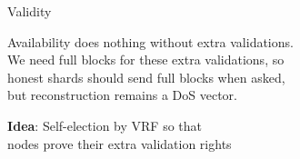 \documentclass[final]{beamer}
\newlength{\sepwid}
\newlength{\onecolwid}
\newlength{\twocolwid}
\begin{document}
\begin{frame}[t]
\begin{columns}[t]
\begin{column}{\twocolwid}
\begin{columns}[t,totalwidth=\twocolwid]
\begin{column}{\onecolwid}
%


\end{column} %

\begin{column}{\onecolwid} %


%


\end{column} %

\end{columns} %

\end{column} %

\begin{column}{\sepwid}\end{column} %

\begin{column}{\onecolwid} %


\begin{block}{Validity}

Availability does nothing without extra validations. \\ \smallskip
We need full blocks for these extra validations, so \\ \smallskip
honest shards should send full blocks when asked, \\ \smallskip
but reconstruction remains a DoS vector.

\bigskip
\bigskip

\textbf{Idea}:  Self-election by VRF so that \\
nodes prove their extra validation rights


\end{block}
\end{column}
\end{columns}
\end{frame}
\end{document}
